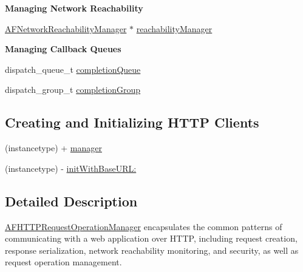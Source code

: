 \begin{Indent}{\bf Managing Network Reachability}\par
{\em 

 

 }\begin{DoxyCompactItemize}
\item 
\hyperlink{interface_a_f_network_reachability_manager}{A\+F\+Network\+Reachability\+Manager} $\ast$ \hyperlink{interface_a_f_h_t_t_p_request_operation_manager_ac77a1fb46d90d7e7b8b9c25bc80feb8a}{reachability\+Manager}
\end{DoxyCompactItemize}
\end{Indent}
\begin{Indent}{\bf Managing Callback Queues}\par
{\em 

 

 }\begin{DoxyCompactItemize}
\item 
dispatch\+\_\+queue\+\_\+t \hyperlink{interface_a_f_h_t_t_p_request_operation_manager_af1b09e063908143fda4bb0b0b176908d}{completion\+Queue}
\item 
dispatch\+\_\+group\+\_\+t \hyperlink{interface_a_f_h_t_t_p_request_operation_manager_a82471e7500e97f86cec41fce3fc43347}{completion\+Group}
\end{DoxyCompactItemize}
\end{Indent}
\subsection*{Creating and Initializing H\+T\+T\+P Clients}
\label{_amgrp73a7335449da7adff927a7dcf1e747d6}%


 

 \begin{DoxyCompactItemize}
\item 
(instancetype) + \hyperlink{interface_a_f_h_t_t_p_request_operation_manager_a754dc33037c729c5ef6a34b12de6884a}{manager}
\item 
(instancetype) -\/ \hyperlink{interface_a_f_h_t_t_p_request_operation_manager_a3e680eeacd86fdcb1fa9e9be01cc89b2}{init\+With\+Base\+U\+R\+L\+:}
\end{DoxyCompactItemize}


\subsection{Detailed Description}
{\ttfamily \hyperlink{interface_a_f_h_t_t_p_request_operation_manager}{A\+F\+H\+T\+T\+P\+Request\+Operation\+Manager}} encapsulates the common patterns of communicating with a web application over H\+T\+T\+P, including request creation, response serialization, network reachability monitoring, and security, as well as request operation management.

